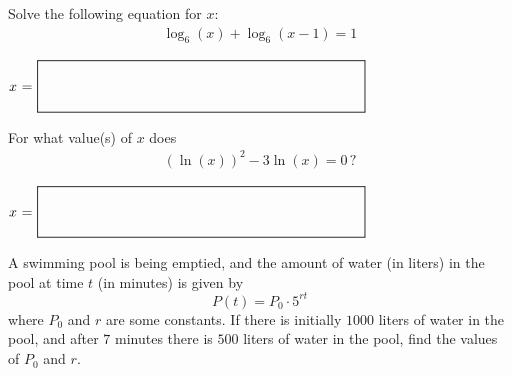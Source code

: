 \documentclass[addpoints,12pt]{exam}
\newcommand*{\Scale}[2][4]{\scalebox{#1}{\ensuremath{#2}}}%
\begin{document}
\begin{questions}
\question[7]
Solve the following equation for $x:$
    \begin{align*}
        \log_{6}(x)+\log_6 (x-1) = 1
    \end{align*}
\vfill
        \begin{center}
$
                \mbox{$x$ = } \Scale[1.5]{\boxed{ \phantom{\dfrac{a}{b}} \hspace{5cm} }}
            $
\end{center}
\question[7]
    For what value(s) of $x$ does
    \begin{align*}
        \left(\ln(x)\right)^2 - 3\ln(x)=0\,?
    \end{align*} \vfill
            \begin{center}
$
                \mbox{$x$ = } \Scale[1.5]{\boxed{ \phantom{\dfrac{a}{b}} \hspace{5cm} }}
            $
\end{center}
    \newpage
    \question A swimming pool is being emptied, and the amount of water (in liters) in the pool at time $t$ (in minutes) is given by 
    \[P(t) = P_0 \cdot 5^{rt}\] where \(P_0\) and \(r\) are some constants. If there is initially $1000$ liters of water in the pool, and after $7$ minutes there is $500$ liters of water in the pool, find the values of $P_0$ and $r$. 
\end{questions}
\end{document}
